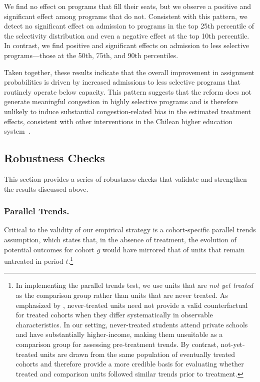 \documentclass[11pt]{article}
\begin{document}
We find no effect on programs that fill their seats, but we observe a positive and significant effect among programs that do not. Consistent with this pattern, we detect no significant effect on admission to programs in the top 25th percentile of the selectivity distribution and even a negative effect at the top 10th percentile. In contrast, we find positive and significant effects on admission to less selective programs—those at the 50th, 75th, and 90th percentiles.

Taken together, these results indicate that the overall improvement in assignment probabilities is driven by increased admissions to less selective programs that routinely operate below capacity. This pattern suggests that the reform does not generate meaningful congestion in highly selective programs and is therefore unlikely to induce substantial congestion-related bias in the estimated treatment effects, consistent with other interventions in the Chilean higher education system~\citep{larroucau2025}.


\subsection{Robustness Checks}
This section provides a series of robustness checks that validate and strengthen the results discussed above.

\subsubsection{Parallel Trends.} 
Critical to the validity of our empirical strategy is a cohort-specific parallel trends assumption, which states that, in the absence of treatment, the evolution of potential outcomes for cohort $g$ would have mirrored that of units that remain untreated in period $t$.\footnote{In implementing the parallel trends test, we use units that are \emph{not yet treated} as the comparison group rather than units that are never treated. As emphasized by \citet{callaway2021}, never-treated units need not provide a valid counterfactual for treated cohorts when they differ systematically in observable characteristics. In our setting, never-treated students attend private schools and have substantially higher-income, making them unsuitable as a comparison group for assessing pre-treatment trends. By contrast, not-yet-treated units are drawn from the same population of eventually treated cohorts and therefore provide a more credible basis for evaluating whether treated and comparison units followed similar trends prior to treatment.}
 
\end{document}
